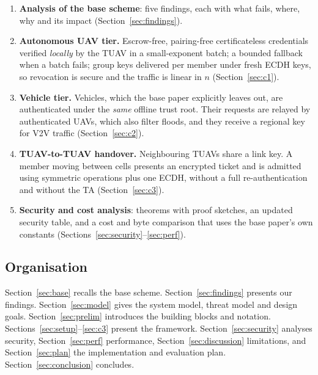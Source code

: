 \begin{enumerate}[label=\textbf{C\arabic*.},leftmargin=*]
  \item[\textbf{A.}] \textbf{Analysis of the base scheme}: five findings, each with what fails, where, why and its impact (Section~\ref{sec:findings}).
  \item[\textbf{C1.}] \textcolor{uavc}{\textbf{Autonomous UAV tier.}} Escrow-free, pairing-free certificateless credentials verified \emph{locally} by the TUAV in a
        small-exponent batch; a bounded fallback when a batch fails; group keys delivered per member under fresh ECDH keys, so revocation is secure and the
        traffic is linear in $n$ (Section~\ref{sec:c1}).
  \item[\textbf{C2.}] \textcolor{vehc}{\textbf{Vehicle tier.}} Vehicles, which the base paper explicitly leaves out, are authenticated under the \emph{same} offline trust root. Their requests
        are relayed by authenticated UAVs, which also filter floods, and they receive a regional key for V2V traffic (Section~\ref{sec:c2}).
  \item[\textbf{C3.}] \textcolor{hoc}{\textbf{TUAV-to-TUAV handover.}} Neighbouring TUAVs share a link key. A member moving between cells presents an encrypted ticket and is
        admitted using symmetric operations plus one ECDH, without a full re-authentication and without the TA (Section~\ref{sec:c3}).
  \item[\textbf{E.}] \textbf{Security and cost analysis}: theorems with proof sketches, an updated security table, and a cost and byte comparison that
        uses the base paper's own constants (Sections~\ref{sec:security}--\ref{sec:perf}).
\end{enumerate}

\subsection{Organisation}
Section~\ref{sec:base} recalls the base scheme. Section~\ref{sec:findings} presents our findings. Section~\ref{sec:model} gives the system model,
threat model and design goals. Section~\ref{sec:prelim} introduces the building blocks and notation. Sections~\ref{sec:setup}--\ref{sec:c3} present the
framework. Section~\ref{sec:security} analyses security, Section~\ref{sec:perf} performance, Section~\ref{sec:discussion} limitations, and
Section~\ref{sec:plan} the implementation and evaluation plan. Section~\ref{sec:conclusion} concludes.

